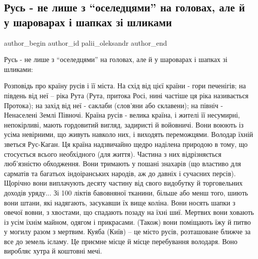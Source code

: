  
 
 
 
 
 
\subsection{Русь - не лише з \enquote{оселедцями} на головах, але й у шароварах і шапках зі шликами}
\label{sec:06_12_2020.fb.palii_oleksandr.1.rus_oseledci}
\ifcmt
	author_begin
   author_id palii_oleksandr
	author_end
\fi


Русь - не лише з \enquote{оселедцями} на головах, але й у шароварах і шапках зі шликами:

\begin{fancyquote}
Розповідь про країну русів і її міста. На схід від цієї країни - гори
печенігів; на південь від неї – ріка Рута (Рута, притока Росі, нині частіше ця
ріка називається Протока); на захід від неї - саклаби (слов'яни або склавени);
на північ - Ненаселені Землі Півночі. Країна русів - велика країна, і жителі її
несумирні, непокірливі, мають гордовитий вигляд, задиристі й войовничі. Вони
воюють із усіма невірними, що живуть навколо них, і виходять переможцями.
Володар їхній зветься Рус-Каган. Ця країна надзвичайно щедро наділена природою
в тому, що стосується всього необхідного (для життя). Частина з них
відрізняється люб'язністю обходження. Вони тримають у пошані знахарів (що
властиво для сарматів та багатьох індоіранських народів, аж до давніх і
сучасних персів). Щорічно вони виплачують десяту частину від свого видобутку й
торговельних доходів уряду... Зі 100 ліктів бавовняної тканини, більше або менш
того, шиють вони штани, які надягають, засукавши їх вище коліна. Вони носять
шапки з овечої вовни, з хвостами, що спадають позаду на їхні шиї. Мертвих вони
ховають із усім їхнім майном, одягом і прикрасами. (Також) вони поміщають їжу й
питво у могилу разом з мертвим. Куяба (Київ) – це місто русів, розташоване
ближче за все до земель ісламу. Це приємне місце й місце перебування володаря.
Воно виробляє хутра й коштовні мечі. 
\end{fancyquote}

